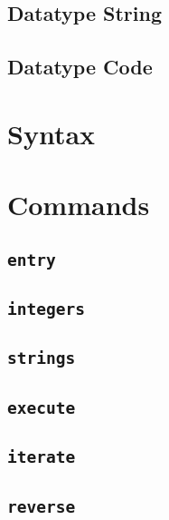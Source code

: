 \INCOMPLETE

\subsection{Datatype String}

\INCOMPLETE

\subsection{Datatype Code}

\INCOMPLETE


\section{Syntax}

\INCOMPLETE

\section{Commands}


\subsection{\texttt{entry}}

\INCOMPLETE

\subsection{\texttt{integers}}

\INCOMPLETE

\subsection{\texttt{strings}}

\INCOMPLETE

\subsection{\texttt{execute}}

\INCOMPLETE

\subsection{\texttt{iterate}}

\INCOMPLETE

\subsection{\texttt{reverse}}

